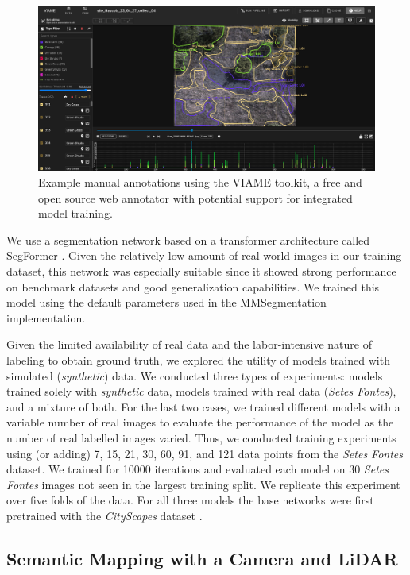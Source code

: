 \begin{figure}[!ht]
    \centering
    \includegraphics[width=\linewidth]{figs/methods/semantic_mapping/viame_example.png}
    \caption{Example manual annotations using the VIAME toolkit, a free and open source web annotator with potential support for integrated model training.}
    \label{fig:methods:manual-annotations}
\end{figure}

We use a segmentation network based on a transformer architecture called SegFormer \cite{Xie2021}. Given the relatively low amount of real-world images in our training dataset, this network was especially suitable since it showed strong performance on benchmark datasets and good generalization capabilities. We trained this model using the default parameters used in the MMSegmentation \cite{mmseg2020} implementation. 

Given the limited availability of real data and the labor-intensive nature of labeling to obtain ground truth, we explored the utility of models trained with simulated (\textit{synthetic}) data. We conducted three types of experiments: models trained solely with \textit{synthetic} data, models trained with real data (\textit{Setes Fontes}), and a mixture of both. For the last two cases, we trained different models with a variable number of real images to evaluate the performance of the model as the number of real labelled images varied. Thus, we conducted training experiments using (or adding) 7, 15, 21, 30, 60, 91, and 121 data points from the \textit{Setes Fontes} dataset. We trained for 10000 iterations and evaluated each model on 30 \textit{Setes Fontes} images not seen in the largest training split. We replicate this experiment over five folds of the data. For all three models the base networks were first pretrained with the \textit{CityScapes} dataset \cite{Cordts2016}.

\subsection{Semantic Mapping with a Camera and LiDAR}

